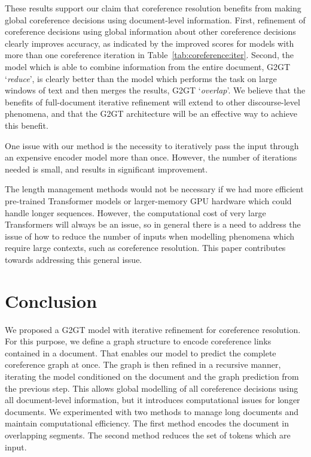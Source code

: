 \documentclass[11pt]{article}
\begin{document}
These results support our claim that coreference resolution benefits from making global coreference decisions using document-level information.  First, refinement of coreference decisions using global information about other coreference decisions clearly improves accuracy, as indicated by the improved scores for models with more than one coreference iteration in Table~\ref{tab:coreference:iter}.  
Second, the model which is able to combine information from the entire document, G2GT `\emph{reduce}', is clearly better than the model which performs the task on large windows of text and then merges the results, G2GT `\emph{overlap}'.
We believe that the benefits of full-document iterative refinement will extend to other discourse-level phenomena, and that the G2GT architecture will be an effective way to achieve this benefit.

One issue with our method is the necessity to iteratively pass the input through an expensive encoder model more than once.
However, the number of iterations needed is small, and results in  significant improvement. 


The length management methods would not be necessary if we had more efficient pre-trained Transformer models or larger-memory GPU hardware which could handle longer sequences.  However, the computational cost of very large Transformers will always be an issue, so in general there is a need to address the issue of how to reduce the number of inputs when modelling phenomena which require large contexts, such as coreference resolution.  This paper contributes towards addressing this general issue.


\section{Conclusion} 
\label{sec:coreference:conclusion}

We proposed a G2GT model with iterative refinement for coreference resolution. For this purpose, we define a graph structure to encode coreference links contained in a document. That enables our model to predict the complete coreference graph at once. The graph is then refined in a recursive manner, iterating the model conditioned on the document and the graph prediction from the previous step.
This allows global modelling of all coreference decisions using all document-level information, but it introduces computational issues for longer documents.
We experimented with two methods to manage long documents and maintain computational efficiency. The first method encodes the document in overlapping segments. The second method reduces the set of tokens which are input. 
\end{document}
